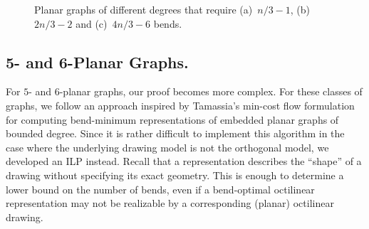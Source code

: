 \documentclass[a4paper,twoside,11pt]{article}
\begin{document}
\begin{figure}[t!]
    \centering
    \begin{minipage}[b]{.32\textwidth}
        \centering
    \end{minipage}
    \begin{minipage}[b]{.32\textwidth}
        \centering
    \end{minipage} 
    \begin{minipage}[b]{.32\textwidth}
        \centering
    \end{minipage}
    \caption{
    Planar graphs of different degrees that require
    (a)~$n/3-1$, (b)~$2n/3-2$ and (c)~$4n/3-6$ bends.} 
    \label{fig:lower_bounds}
\end{figure}

\subsection{5- and 6-Planar Graphs.} 
\label{sec:56planarl}


For $5$- and $6$-planar graphs, our proof becomes more complex. For
these classes of graphs, we follow an approach inspired by Tamassia's
min-cost flow formulation~\cite{Tamassia87} for computing
bend-minimum representations of embedded planar graphs of bounded
degree. Since it is rather difficult to implement this algorithm in
the case where the underlying drawing model is not the orthogonal
model, we developed an ILP instead. Recall that a representation
describes the ``shape'' of a drawing without specifying its exact
geometry. This is enough to determine a lower bound on the number of
bends, even if a bend-optimal octilinear representation may not be
realizable by a corresponding (planar) octilinear drawing.
\end{document}
